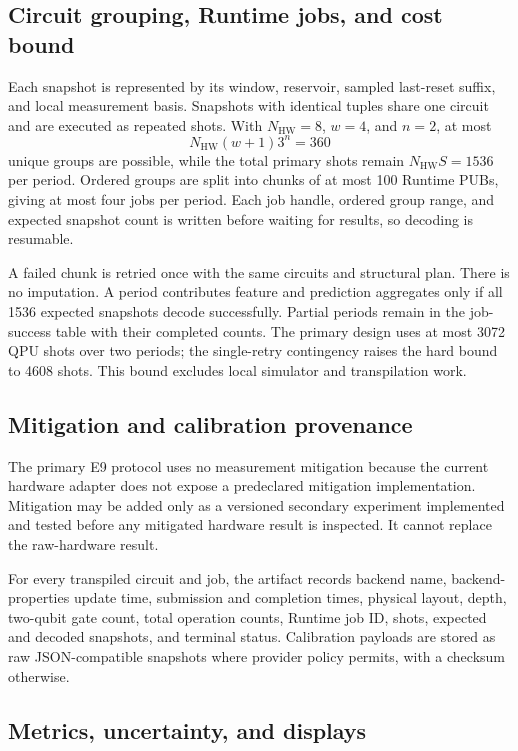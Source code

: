 \subsection{Circuit grouping, Runtime jobs, and cost bound}
\label{app:hardware-jobs}

Each snapshot is represented by its window, reservoir, sampled last-reset
suffix, and local measurement basis.  Snapshots with identical tuples share one
circuit and are executed as repeated shots.  With \(N_{\mathrm{HW}}=8\),
\(w=4\), and \(n=2\), at most
\[
 N_{\mathrm{HW}}(w+1)3^n=360
\]
unique groups are possible, while the total primary shots remain
\(N_{\mathrm{HW}}S=1536\) per period.  Ordered groups are split into chunks of
at most 100 Runtime PUBs, giving at most four jobs per period.  Each job handle,
ordered group range, and expected snapshot count is written before waiting for
results, so decoding is resumable.

A failed chunk is retried once with the same circuits and structural plan.
There is no imputation.  A period contributes feature and prediction aggregates
only if all 1536 expected snapshots decode successfully.  Partial periods remain
in the job-success table with their completed counts.  The primary design uses
at most 3072 QPU shots over two periods; the single-retry contingency raises the
hard bound to 4608 shots.  This bound excludes local simulator and transpilation
work.

\subsection{Mitigation and calibration provenance}
\label{app:hardware-mitigation}

The primary E9 protocol uses no measurement mitigation because the current
hardware adapter does not expose a predeclared mitigation implementation.
Mitigation may be added only as a versioned secondary experiment implemented
and tested before any mitigated hardware result is inspected.  It cannot
replace the raw-hardware result.

For every transpiled circuit and job, the artifact records backend name,
backend-properties update time, submission and completion times, physical
layout, depth, two-qubit gate count, total operation counts, Runtime job ID,
shots, expected and decoded snapshots, and terminal status.  Calibration
payloads are stored as raw JSON-compatible snapshots where provider policy
permits, with a checksum otherwise.

\subsection{Metrics, uncertainty, and displays}
\label{app:hardware-metrics}

